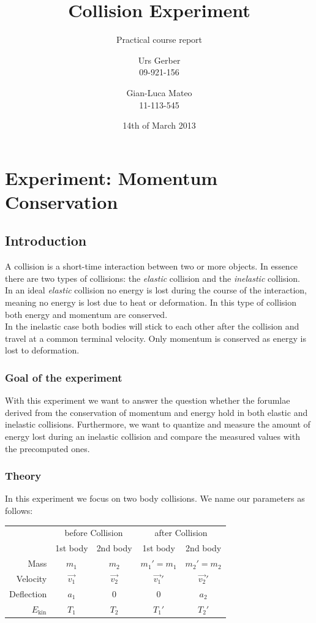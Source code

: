 \documentclass{scrreprt}
\author{Urs Gerber\\09-921-156 \and Gian-Luca Mateo\\11-113-545}
\date{14th of March 2013}
\title{Collision Experiment}
\subtitle{Practical course report}
\renewcommand{\emph}[1]{\textit{#1}}
\begin{document}
\maketitle

\tableofcontents
\newpage

\chapter{Experiment: Momentum Conservation}
\section{Introduction}
A collision is a short-time interaction between two or more objects. In essence there are two types of collisions: the \emph{elastic} collision and the \emph{inelastic} collision.\\
In an ideal \emph{elastic} collision no energy is lost during the course of the interaction, meaning no energy is lost due to heat or deformation. In this type of collision both energy and momentum are conserved.\\
In the inelastic case both bodies will stick to each other after the collision and travel at a common terminal velocity. Only momentum is conserved as energy is lost to deformation.
 
\subsection{Goal of the experiment}
With this experiment we want to answer the question whether the forumlae derived from the conservation of momentum and energy hold in both elastic and inelastic collisions. Furthermore, we want to quantize and measure the amount of energy lost during an inelastic collision and compare the measured values with the precomputed ones.
\subsection{Theory}
In this experiment we focus on two body collisions. We name our parameters as follows:

\begin{table}[H]
\center
\begin{tabular}{|r|cc|cc|}
\hline

 & \multicolumn{2}{c|}{before Collision} &  \multicolumn{2}{c|}{after Collision}\\
 & 1st body & 2nd body & 1st body & 2nd body\\ \hline\hline
 Mass & $m_1$ & $m_2$ & $m_1'=m_1$ & $m_2'=m_2$\\
 Velocity & $\vec{v_1}$ & $\vec{v_2}$ & $\vec{v_1}'$ & $\vec{v_2}'$\\
 Deflection & $a_1$ & 0 & 0 & $a_2$ \\
 $E_{\text{kin}}$ & $T_1$ & $T_2$ & $T_1'$ & $T_2'$\\

\hline
\end{tabular}
\end{table}
\end{document}
